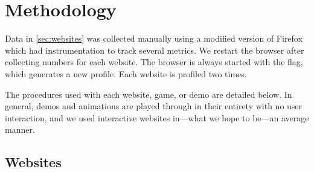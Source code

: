 \section{Methodology}
\label{app:methodology}

Data in \Section\ref{sec:websites} was collected manually using a modified
version of Firefox which had instrumentation to track several metrics. We
restart the browser after collecting numbers for each website. The browser is
always started with the  flag, which generates a new
profile. Each website is profiled two times.

The procedures used with each website, game, or demo are detailed below. In
general, demos and animations are played through in their entirety with no
user interaction, and we used interactive websites in---what we hope to
be---an average manner.

\subsection{Websites}

